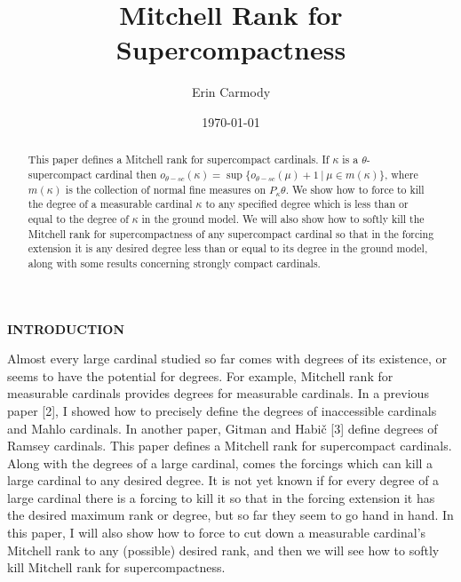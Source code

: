 \documentclass[10pt,leqno]{amsart}
\begin{document}
\title{Mitchell Rank for Supercompactness} %
\author[Initial Surname]{Erin Carmody}
\date{\today}
\address{}
\maketitle

\let\thefootnote\relax
\footnotetext{} %

\begin{abstract}
This paper defines a Mitchell rank for supercompact cardinals. If $\kappa$ is a $\theta$-supercompact cardinal then $o_{\theta-sc}(\kappa) = \sup \{ o_{\theta-sc}(\mu) + 1 \ | \ \mu \in m(\kappa)\}$, where $m(\kappa)$ is the collection of normal fine measures on $P_{\kappa}\theta$. We show how to force to kill the degree of a measurable cardinal $\kappa$ to any specified degree which is less than or equal to the degree of $\kappa$ in the ground model. We will also show how to softly kill the Mitchell rank for supercompactness of any supercompact cardinal so that in the forcing extension it is any desired degree less than or equal to its degree in the ground model, along with some results concerning strongly compact cardinals. 
\end{abstract} %

\bigskip
\begin{center}\textbf{INTRODUCTION}\end{center}
\vspace{.2 in}

Almost every large cardinal studied so far comes with degrees of its existence, or seems to have the potential for degrees. For example, Mitchell rank for measurable cardinals provides degrees for measurable cardinals. In a previous paper [2], I showed how to precisely define the degrees of inaccessible cardinals and Mahlo cardinals. In another paper, Gitman and Habič [3] define degrees of Ramsey cardinals. This paper defines a Mitchell rank for supercompact cardinals. Along with the degrees of a large cardinal, comes the forcings which can kill a large cardinal to any desired degree. It is not yet known if for every degree of a large cardinal there is a forcing to kill it so that in the forcing extension it has the desired maximum rank or degree, but so far they seem to go hand in hand. In this paper, I will also show how to force to cut down a measurable cardinal's Mitchell rank to any (possible) desired rank, and then we will see how to softly kill Mitchell rank for supercompactness.
\end{document}
